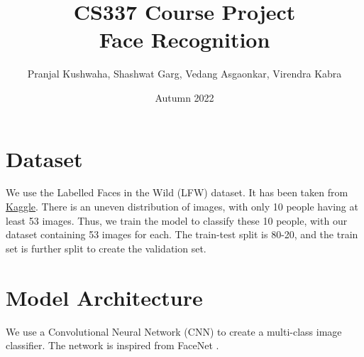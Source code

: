 \documentclass{article}
\title{\textbf{CS337 Course Project \\ Face Recognition}}
\author{Pranjal Kushwaha, Shashwat Garg, Vedang Asgaonkar, Virendra Kabra}
\date{Autumn 2022}
\begin{document}
\begin{sloppypar}       %

    \maketitle
    \tableofcontents

    \newpage

    \section{Dataset}
    We use the Labelled Faces in the Wild (LFW) dataset. It has been taken from \href{https://www.kaggle.com/datasets/jessicali9530/lfw-dataset}{Kaggle}. There is an uneven distribution of images, with only 10 people having at least 53 images. Thus, we train the model to classify these 10 people, with our dataset containing 53 images for each. The train-test split is 80-20, and the train set is further split to create the validation set.

    \section{Model Architecture}

    We use a Convolutional Neural Network (CNN) to create a multi-class image classifier. The network is inspired from FaceNet \cite{facenet}.


\end{sloppypar}
\end{document}
